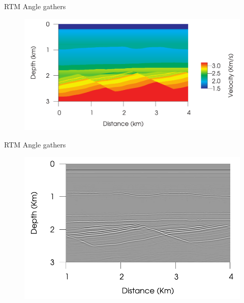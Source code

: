 \documentclass[xcolor=dvipsnames,notes]{beamer}
\begin{document}
\begin{frame}{RTM Angle gathers}
\begin{figure}
\includegraphics[width=\textwidth]{Fig/fig11.pdf}
\end{figure}
\end{frame}
\begin{frame}{RTM Angle gathers}
\begin{figure}
\includegraphics[width=\textwidth]{Fig/fig12.pdf}
\end{figure}
\end{frame}
\end{document}
